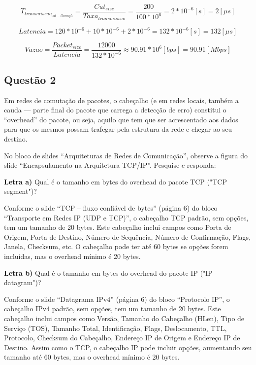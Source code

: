 \documentclass[12pt]{article}
\begin{document}
\begin{titlepage}
\begin{equation}
	T_{transmissao_{cut-through}} = \frac{Cut_{size}}{Taxa_{transmissao}} = \frac{200}{100 * 10^6} =  2*10^{-6} [s] = 2 [\mu s]
\end{equation}

\begin{equation}
	Latencia = 120 * 10^{-6} + 10 * 10^{-6} + 2*10^{-6} = 132 * 10^{-6} [s] = 132 [\mu s]
\end{equation}

\begin{equation}
	Vazao = \frac{Packet_{size}}{Latencia} = \frac{12000}{132 * 10^{-6}} \approx 90.91 * 10^6 [bps] = 90.91 [Mbps]
\end{equation}

\subsection*{Questão 2}

Em redes de comutação de pacotes, o cabeçalho (e em redes locais, também a cauda — parte final do pacote que carrega a detecção de erro) constitui o “overhead” do pacote, ou seja, aquilo que tem que ser acrescentado aos dados para que os mesmos possam trafegar pela estrutura da rede e chegar ao seu destino.

No bloco de slides “Arquiteturas de Redes de Comunicação”, observe a figura do slide “Encapsulamento na Arquitetura TCP/IP”. Pesquise e responda:

\textbf{Letra a)} Qual é o tamanho em bytes do overhead do pacote TCP ("TCP segment")?

Conforme o slide “TCP – fluxo confiável de bytes” (página 6) do bloco “Transporte em Redes IP (UDP e TCP)”, o cabeçalho TCP padrão, sem opções, tem um tamanho de 20 bytes. Este cabeçalho inclui campos como Porta de Origem, Porta de Destino, Número de Sequência, Número de Confirmação, Flags, Janela, Checksum, etc. O cabeçalho pode ter até 60 bytes se opções forem incluídas, mas o overhead mínimo é 20 bytes.

\textbf{Letra b)} Qual é o tamanho em bytes do overhead do pacote IP ("IP datagram")?

Conforme o slide “Datagrama IPv4” (página 6) do bloco “Protocolo IP”, o cabeçalho IPv4 padrão, sem opções, tem um tamanho de 20 bytes. Este cabeçalho inclui campos como Versão, Tamanho do Cabeçalho (HLen), Tipo de Serviço (TOS), Tamanho Total, Identificação, Flags, Deslocamento, TTL, Protocolo, Checksum do Cabeçalho, Endereço IP de Origem e Endereço IP de Destino. Assim como o TCP, o cabeçalho IP pode incluir opções, aumentando seu tamanho até 60 bytes, mas o overhead mínimo é 20 bytes.


\end{titlepage}
\end{document}
